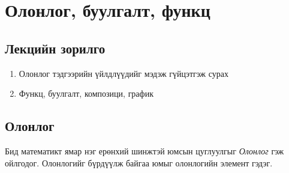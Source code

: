 \chapter{Олонлог, буулгалт, функц}
\section*{Лекцийн зорилго}
\begin{enumerate}
    \item Олонлог тэдгээрийн үйлдлүүдийг мэдэж гүйцэтгэж сурах
    \item Функц, буулгалт, композици, график 
\end{enumerate}
\section{Олонлог}
Бид математикт ямар нэг ерөнхий шинжтэй юмсын цуглуулгыг {\it Олонлог} гэж ойлгодог.
Олонлогийг бүрдүүлж байгаа юмыг олонлогийн элемент гэдэг. 


